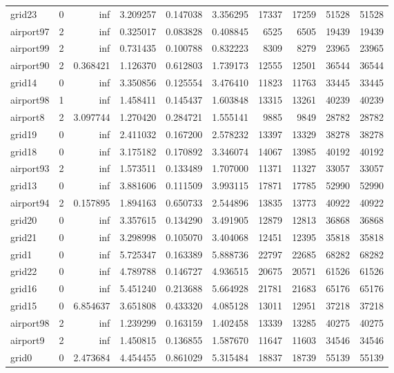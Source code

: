 \begin{longtable}{|l|r|r|r|r|r|r|r|r|r|}
grid23 & 0 & inf & 3.209257 & 0.147038 & 3.356295 & 17337 & 17259 & 51528 & 51528 \\
airport97 & 2 & inf & 0.325017 & 0.083828 & 0.408845 & 6525 & 6505 & 19439 & 19439 \\
airport99 & 2 & inf & 0.731435 & 0.100788 & 0.832223 & 8309 & 8279 & 23965 & 23965 \\
airport90 & 2 & 0.368421 & 1.126370 & 0.612803 & 1.739173 & 12555 & 12501 & 36544 & 36544 \\
grid14 & 0 & inf & 3.350856 & 0.125554 & 3.476410 & 11823 & 11763 & 33445 & 33445 \\
airport98 & 1 & inf & 1.458411 & 0.145437 & 1.603848 & 13315 & 13261 & 40239 & 40239 \\
airport8 & 2 & 3.097744 & 1.270420 & 0.284721 & 1.555141 & 9885 & 9849 & 28782 & 28782 \\
grid19 & 0 & inf & 2.411032 & 0.167200 & 2.578232 & 13397 & 13329 & 38278 & 38278 \\
grid18 & 0 & inf & 3.175182 & 0.170892 & 3.346074 & 14067 & 13985 & 40192 & 40192 \\
airport93 & 2 & inf & 1.573511 & 0.133489 & 1.707000 & 11371 & 11327 & 33057 & 33057 \\
grid13 & 0 & inf & 3.881606 & 0.111509 & 3.993115 & 17871 & 17785 & 52990 & 52990 \\
airport94 & 2 & 0.157895 & 1.894163 & 0.650733 & 2.544896 & 13835 & 13773 & 40922 & 40922 \\
grid20 & 0 & inf & 3.357615 & 0.134290 & 3.491905 & 12879 & 12813 & 36868 & 36868 \\
grid21 & 0 & inf & 3.298998 & 0.105070 & 3.404068 & 12451 & 12395 & 35818 & 35818 \\
grid1 & 0 & inf & 5.725347 & 0.163389 & 5.888736 & 22797 & 22685 & 68282 & 68282 \\
grid22 & 0 & inf & 4.789788 & 0.146727 & 4.936515 & 20675 & 20571 & 61526 & 61526 \\
grid16 & 0 & inf & 5.451240 & 0.213688 & 5.664928 & 21781 & 21683 & 65176 & 65176 \\
grid15 & 0 & 6.854637 & 3.651808 & 0.433320 & 4.085128 & 13011 & 12951 & 37218 & 37218 \\
airport98 & 2 & inf & 1.239299 & 0.163159 & 1.402458 & 13339 & 13285 & 40275 & 40275 \\
airport9 & 2 & inf & 1.450815 & 0.136855 & 1.587670 & 11647 & 11603 & 34546 & 34546 \\
grid0 & 0 & 2.473684 & 4.454455 & 0.861029 & 5.315484 & 18837 & 18739 & 55139 & 55139 \\

\end{longtable}

